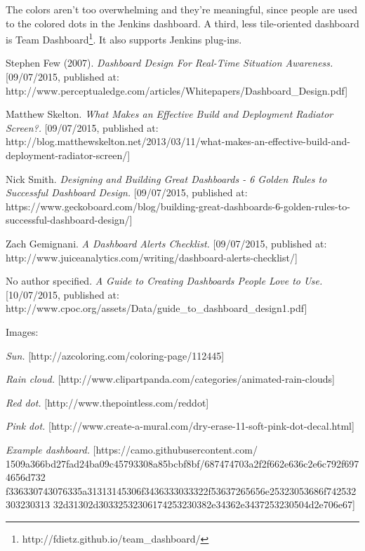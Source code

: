 \documentclass[10pt,a4paper]{article}
\begin{document}
\begin{appendices}
The colors aren’t too overwhelming and they’re meaningful, since people are used to the colored dots in the Jenkins dashboard. 
A third, less tile-oriented dashboard is Team Dashboard\footnote{http://fdietz.github.io/team\_dashboard/}. It also supports Jenkins plug-ins.


\begin{thebibliography}{11} 

 Stephen Few (2007). \emph{Dashboard Design For Real-Time Situation Awareness.} [09/07/2015, published at: http://www.perceptualedge.com/articles/Whitepapers/Dashboard\_Design.pdf]

 Matthew Skelton. \emph{What Makes an Effective Build and Deployment Radiator Screen?.} [09/07/2015, published at: http://blog.matthewskelton.net/2013/03/11/what-makes-an-effective-build-and-deployment-radiator-screen/]

 Nick Smith. \emph{Designing and Building Great Dashboards - 6 Golden Rules to Successful Dashboard Design.} [09/07/2015, published at: https://www.geckoboard.com/blog/building-great-dashboards-6-golden-rules-to-successful-dashboard-design/]

 Zach Gemignani. \emph{A Dashboard Alerts Checklist.} [09/07/2015, published at: http://www.juiceanalytics.com/writing/dashboard-alerts-checklist/]

 No author specified. \emph{A Guide to Creating Dashboards People Love to Use.} [10/07/2015, published at: http://www.cpoc.org/assets/Data/guide\_to\_dashboard\_design1.pdf]

Images:

 \emph{Sun.} [http://azcoloring.com/coloring-page/112445]

 \emph{Rain cloud.} [http://www.clipartpanda.com/categories/animated-rain-clouds]

 \emph{Red dot.} [http://www.thepointless.com/reddot]

 \emph{Pink dot.} [http://www.create-a-mural.com/dry-erase-11-soft-pink-dot-decal.html]

 \emph{Example dashboard.}  [https://camo.githubusercontent.com/
1509a366bd27fad24ba09c45793308a85bcbf8bf/687474703a2f2f662e636c2e6c792f6974656d732
f336330743076335a31313145306f3436333033322f53637265656e25323053686f742532303230313
32d31302d30332532306174253230382e34362e3437253230504d2e706e67]

\end{thebibliography}
\clearpage


\end{appendices}
\end{document}
